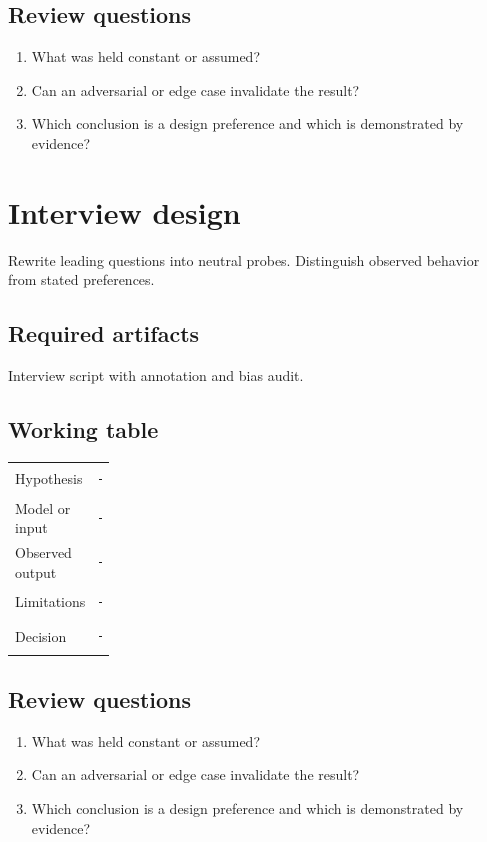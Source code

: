 \documentclass[11pt]{article}
\begin{document}
\subsection{Review questions}
\begin{enumerate}
\item What was held constant or assumed?
\item Can an adversarial or edge case invalidate the result?
\item Which conclusion is a design preference and which is demonstrated by evidence?
\end{enumerate}

\section{Interview design}
Rewrite leading questions into neutral probes. Distinguish observed behavior from stated preferences.


\subsection{Required artifacts}
Interview script with annotation and bias audit.


\subsection{Working table}
\begin{tabularx}{\linewidth}{@{}p{0.20\linewidth}X@{}}\toprule
Hypothesis & \rule{0.90\linewidth}{0.4pt}\\[0.35cm]
Model or input & \rule{0.90\linewidth}{0.4pt}\\[0.35cm]
Observed output & \rule{0.90\linewidth}{0.4pt}\\[0.35cm]
Limitations & \rule{0.90\linewidth}{0.4pt}\\[0.35cm]
Decision & \rule{0.90\linewidth}{0.4pt}\\\bottomrule\end{tabularx}

\subsection{Review questions}
\begin{enumerate}
\item What was held constant or assumed?
\item Can an adversarial or edge case invalidate the result?
\item Which conclusion is a design preference and which is demonstrated by evidence?
\end{enumerate}
\end{document}
